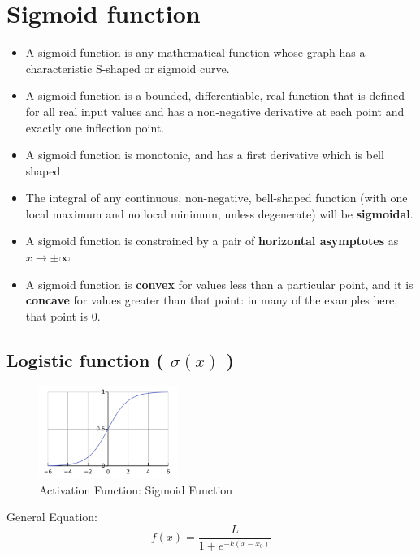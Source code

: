 \section{Sigmoid function \cite{wiki-activation-fn,wiki-Sigmoid_function}}

\begin{itemize}
    \item A sigmoid function is any mathematical function whose graph has a characteristic S-shaped or sigmoid curve.
    \item A sigmoid function is a bounded, differentiable, real function that is defined for all real input values and has a non-negative derivative at each point and exactly one inflection point.
    \item A sigmoid function is monotonic, and has a first derivative which is bell shaped
    \item The integral of any continuous, non-negative, bell-shaped function (with one local maximum and no local minimum, unless degenerate) will be \textbf{sigmoidal}.
    \item A sigmoid function is constrained by a pair of \textbf{horizontal asymptotes} as $x\rightarrow \pm \infty$
    \item A sigmoid function is \textbf{convex} for values less than a particular point, and it is \textbf{concave} for values greater than that point: in many of the examples here, that point is 0.
\end{itemize}

\subsection{Logistic function ( $\sigma(x)$ ) \cite{wiki-Logistic_function,wiki-Sigmoid_function}}\label{Logistic function}

\begin{figure}[H]
    \centering
    \includegraphics[height=3cm]{Pictures/activation-fns/sigmoid-fn.jpg}
    \caption{Activation Function: Sigmoid Function}
\end{figure}

General Equation:
\[
    f(x) = {\displaystyle\dfrac{L}{1 + e^{-k(x - x_{0})}}}
\]


